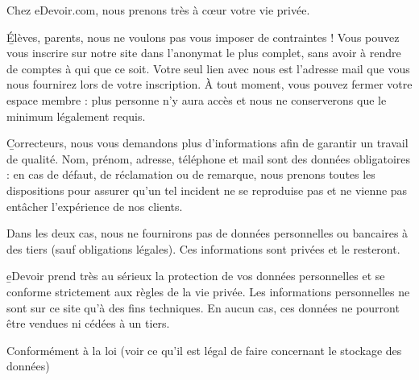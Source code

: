 Chez eDevoir.com, nous prenons très à cœur votre vie privée.

\b{Élèves}, \b{parents}, nous ne voulons pas vous imposer de contraintes ! Vous pouvez vous inscrire sur notre site dans l’anonymat le plus complet, sans avoir à rendre de comptes à qui que ce soit. Votre seul lien avec nous est l’adresse mail que vous nous fournirez lors de votre inscription. À tout moment, vous pouvez fermer votre espace membre : plus personne n’y aura accès et nous ne conserverons que le minimum légalement requis.

\b{Correcteurs}, nous vous demandons plus d’informations afin de garantir un travail de qualité.  Nom, prénom, adresse, téléphone et mail sont des données obligatoires : en cas de défaut, de réclamation ou de remarque, nous prenons toutes les dispositions pour assurer qu’un tel incident ne se reproduise pas et ne vienne pas entâcher l’expérience de nos clients.

Dans les deux cas, nous ne fournirons pas de données personnelles ou bancaires à des tiers (sauf obligations légales). Ces informations sont privées et le resteront.

\b{eDevoir} prend très au sérieux la protection de vos données personnelles et se conforme strictement aux règles de la vie privée. Les informations personnelles ne sont sur ce site qu'à des fins techniques. En aucun cas, ces données ne pourront être vendues ni cédées à un tiers.

Conformément à la loi (voir ce qu'il est légal de faire concernant le stockage des données)